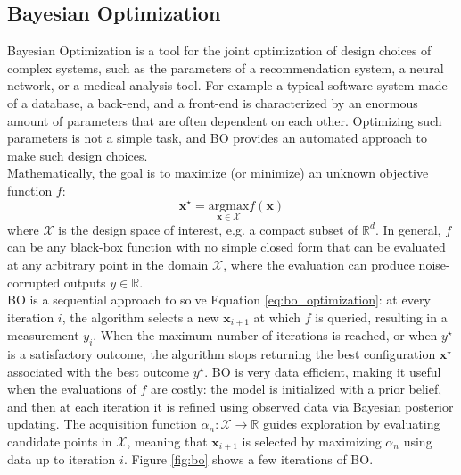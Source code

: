 \documentclass[a4paper, 12pt]{article} %
\begin{document}
	\subsection{Bayesian Optimization } \label{ssec:bayesian_optimization}
	Bayesian Optimization \cite{BO} is a tool for the joint optimization of design choices of complex systems, such as the parameters of a recommendation system, a neural network, or a medical analysis tool. For example a typical software system made of a database, a back-end, and a front-end is characterized by an enormous amount of parameters that are often dependent on each other.
	Optimizing such parameters is not a simple task, and BO provides an automated approach to make such design choices.\\
	
	Mathematically, the goal is to maximize (or minimize) an unknown objective function $f$:\\
	\begin{equation} \label{eq:bo_optimization}
				\pmb{x}^\star = \underset{\pmb{x} \in \mathcal{X}}{\mathrm{argmax}} f(\pmb{x})
	\end{equation}
	where $\mathcal{X}$ is the design space of interest, e.g. a compact subset of $\mathbb{R}^d$. In general, $f$ can be any black-box function with no simple closed form that can be evaluated at any arbitrary point in the domain $\mathcal{X}$, where the evaluation can produce noise-corrupted outputs $y \in \mathbb{R}$.\\
	BO is a sequential approach to solve Equation \ref{eq:bo_optimization}: at every iteration $i$, the algorithm selects a new $\pmb{x}_{i+1}$ at which $f$ is queried, resulting in a measurement $y_i$. When the maximum number of iterations is reached, or when $y^\star$ is a satisfactory outcome, the algorithm stops returning the best configuration $\pmb{x}^\star$ associated with the best outcome $y^\star$. BO is very data efficient, making it useful when the evaluations of $f$ are costly: the model is initialized with a prior belief, and then at each iteration it is refined using observed data via Bayesian posterior updating. The acquisition function $\alpha_n : \mathcal{X} \rightarrow \mathbb{R}$ guides exploration by evaluating candidate points in $\mathcal{X}$, meaning that $\pmb{x}_{i+1}$ is selected by maximizing $\alpha_n$ using data up to iteration $i$. Figure \ref{fig:bo} shows a few iterations of BO.
\end{document}

